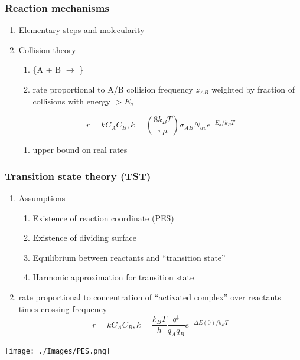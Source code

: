 \documentclass[11pt]{article}
\begin{document}
\subsubsection{Reaction mechanisms}
\label{sec:orgcc9c904}
\begin{enumerate}
\item Elementary steps and molecularity
\item Collision theory
\begin{enumerate}
\item \ce\{A + B \(\rightarrow\) \}
\item rate proportional to A/B collision frequency \(z_{AB}\) weighted by fraction of collisions with energy \(> E_a\)
\end{enumerate}
\begin{displaymath}
   r = k C_A C_B , k = \left ( \frac{8 k_B T}{\pi \mu} \right ) \sigma_{AB} N_{av} e^{-E_a/k_BT}
\end{displaymath}
\begin{enumerate}
\item upper bound on real rates
\end{enumerate}
\end{enumerate}
\subsubsection{Transition state theory (TST)}
\label{sec:org7be6604}
\begin{enumerate}
\item Assumptions
\begin{enumerate}
\item Existence of reaction coordinate (PES)
\item Existence of dividing surface
\item Equilibrium between reactants and ``transition state''
\item Harmonic approximation for transition state
\end{enumerate}
\item rate proportional to concentration of ``activated complex'' over reactants times crossing frequency
\begin{displaymath}
   r = k C_A C_B , k = \frac{k_B T}{h} \frac{q^\ddagger}{q_A q_B}  e^{-{\Delta E(0)/k_BT}}
\end{displaymath}
\end{enumerate}

\begin{center}
\texttt{[image: ./Images/PES.png]}
\end{center}
\end{document}
